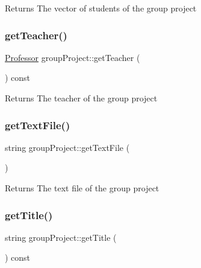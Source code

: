 \begin{DoxyReturn}{Returns}
The vector of students of the group project 
\end{DoxyReturn}
\mbox{\label{classgroup_project_a92a97c4315a9da791736ae288b066c88}} 
\subsubsection{\texorpdfstring{get\+Teacher()}{getTeacher()}}
{\footnotesize\ttfamily \hyperlink{class_professor}{Professor} group\+Project\+::get\+Teacher (\begin{DoxyParamCaption}{ }\end{DoxyParamCaption}) const}

\begin{DoxyReturn}{Returns}
The teacher of the group project 
\end{DoxyReturn}
\mbox{\label{classgroup_project_a26fc6b2b8c581fa50e618f0c38def88c}} 
\subsubsection{\texorpdfstring{get\+Text\+File()}{getTextFile()}}
{\footnotesize\ttfamily string group\+Project\+::get\+Text\+File (\begin{DoxyParamCaption}{ }\end{DoxyParamCaption})}

\begin{DoxyReturn}{Returns}
The text file of the group project 
\end{DoxyReturn}
\mbox{\label{classgroup_project_ae903de6e07211017fc8133713dbb0a1b}} 
\subsubsection{\texorpdfstring{get\+Title()}{getTitle()}}
{\footnotesize\ttfamily string group\+Project\+::get\+Title (\begin{DoxyParamCaption}{ }\end{DoxyParamCaption}) const}

